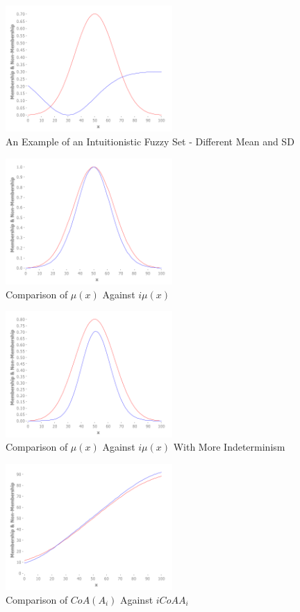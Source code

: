 \documentclass[conference]{IEEEtran}
\begin{document}
\begin{figure}[!t]
  \centering
  \includegraphics[width=2.5in]{ifs-diff-mu-sd}
  \caption{An Example of an Intuitionistic Fuzzy Set - Different Mean
    and SD}
  \label{ifs-diff-mu-sd}
\end{figure}

\begin{figure}[!t]
  \centering
  \includegraphics[width=2.5in]{if-membership}
  \caption{Comparison of $\mu(x)$ Against $i\mu(x)$}
  \label{if-membership}
\end{figure}

\begin{figure}[!t]
  \centering
  \includegraphics[width=2.5in]{if-membership-drastic}
  \caption{Comparison of $\mu(x)$ Against $i\mu(x)$ With More Indeterminism}
  \label{if-membership-drastic}
\end{figure}

\begin{figure}[!t]
  \centering
  \includegraphics[width=2.5in]{if-coa-vs-coa}
  \caption{Comparison of $CoA(A_{i})$ Against $iCoA{A_{i}}$}
  \label{if-coa-vs-coa}
\end{figure}
\end{document}
